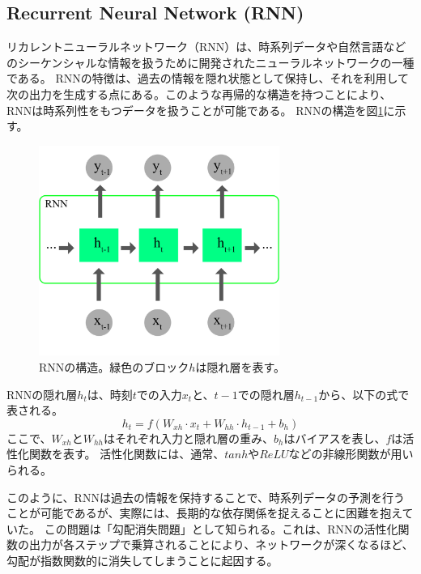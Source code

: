     \subsection{Recurrent Neural Network (RNN)}
    リカレントニューラルネットワーク（RNN）は、時系列データや自然言語などのシーケンシャルな情報を扱うために開発されたニューラルネットワークの一種である。
    RNNの特徴は、過去の情報を隠れ状態として保持し、それを利用して次の出力を生成する点にある。このような再帰的な構造を持つことにより、RNNは時系列性をもつデータを扱うことが可能である。
    RNNの構造を図\ref{fig:rnn}に示す。
    \begin{figure}[htbp]
      \centering
      \includegraphics[width=0.7\textwidth]{figures/videoprediction/rnn.jpg}
      \caption{RNNの構造。緑色のブロック\( h \)は隠れ層を表す。}
      \label{fig:rnn}
    \end{figure}
    
    RNNの隠れ層\( h_t \)は、時刻\( t \)での入力\( x_t \)と、\( t-1 \)での隠れ層\( h_{t-1} \)から、以下の式で表される。
    \begin{equation}
      h_t = f(W_{xh} \cdot x_t + W_{hh} \cdot h_{t-1} + b_h)
    \end{equation}
    ここで、\( W_{xh} \)と\( W_{hh} \)はそれぞれ入力と隠れ層の重み、\( b_h \)はバイアスを表し、\( f \)は活性化関数を表す。
    活性化関数には、通常、\( tanh \)や\( ReLU \)などの非線形関数が用いられる。

    このように、RNNは過去の情報を保持することで、時系列データの予測を行うことが可能であるが、実際には、長期的な依存関係を捉えることに困難を抱えていた。
    この問題は「勾配消失問題」として知られる。これは、RNNの活性化関数の出力が各ステップで乗算されることにより、ネットワークが深くなるほど、勾配が指数関数的に消失してしまうことに起因する。
    
